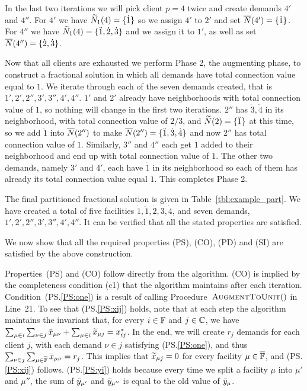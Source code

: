 \documentclass[oneside,final]{ucr}
\begin{document}
In the last two iterations we will pick client $p=4$ twice and
create demands $4'$ and $4''$. For $4'$ we have ${\widetilde N}_1(4) =
\{\dot{1}\}$ so we assign $4'$ to $2'$ and set ${\overline{N}}(4') =
\{\dot{1}\}$. For $4''$ we have ${\widetilde N}_1(4) = \{\ddot{1}, \dot{2},
\dot{3}\}$ and we assign it to $1'$, as well as set ${\overline{N}}(4'') =
\{\dot{2}, \dot{3}\}$.

Now that all clients are exhausted we perform Phase 2, the augmenting
phase, to construct a fractional solution in which all demands have
total connection value equal to $1$.  We iterate through each of the
seven demands created, that is $1',2',2'',3',3'',4',4''$.  $1'$ and $2'$
already have neighborhoods with total connection value of $1$, so
nothing will change in the first two iterations.
$2''$ has $\dot{3},\dot{4}$ in its neighborhood, with total connection value of
$2/3$, and ${\widetilde N}(2) = \{\ddot{1}\}$ at this time, so we add
$\ddot{1}$ into ${\overline{N}}(2'')$ to make ${\overline{N}}(2'') = \{\ddot{1},
\dot{3}, \dot{4}\}$ and now $2''$ has total connection value of
$1$. Similarly, $3''$ and $4''$ each get $\ddot{1}$ added to their
neighborhood and end up with total connection value of $1$. The other
two demands, namely $3'$ and $4'$, each have $\dot{1}$ in its
neighborhood so each of them has already its total connection value
equal $1$. This completes Phase 2.

The final partitioned fractional solution is given in
Table~\ref{tbl:example_part}. We have created a total of five
facilities $\dot{1}, \ddot{1}, \dot{2}, \dot{3}, \dot{4}$, and seven
demands, $1',2',2'',3',3'',4',4''$. It can be verified that all the
stated properties are satisfied.



\medskip

  We now show that all the
required properties (PS), (CO), (PD) and (SI) are satisfied
by the above construction.

Properties~(PS) and (CO) follow directly from the
algorithm. (CO) is implied by the completeness condition
(c1) that the algorithm maintains after each
iteration. Condition~(PS.\ref{PS:one}) is a result of
calling Procedure~${\textsc{AugmentToUnit}}()$ in Line~21. To see that
(PS.\ref{PS:xij}) holds, note that
at each step the algorithm maintains the
invariant that, for every $i\in\mathbb{F}$ and
$j\in\mathbb{C}$, we have $\sum_{\mu\in i}\sum_{\nu \in j}
{\bar x}_{\mu \nu} + \sum_{\mu\in i} {\widetilde x}_{\mu j} =
x_{ij}^\ast$. In the end, we will create $r_j$ demands for
each client $j$, with each demand $\nu\in j$ satisfying
(PS.\ref{PS:one}), and thus $\sum_{\nu\in
  j}\sum_{\mu\in\overline{\mathbb{F}}}{\bar x}_{\mu\nu}=r_j$.  This
implies that ${\widetilde x}_{\mu j}=0$ for every facility
$\mu\in\overline{\mathbb{F}}$, and (PS.\ref{PS:xij}) follows.
(PS.\ref{PS:yi}) holds because every time we split a
facility $\mu$ into $\mu'$ and $\mu''$, the sum of
${\bar y}_{\mu'}$ and ${\bar y}_{\mu''}$ is equal to the old value of
${\bar y}_{\mu}$.
\end{document}
